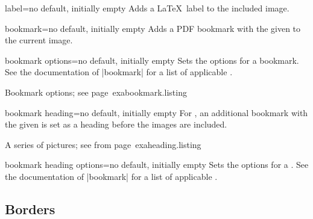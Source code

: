 \documentclass[a4paper,11pt]{ltxdoc}
\begin{document}
\clearpage

\begin{docIgrKey}{label}{=}{no default, initially empty}
  Adds a \LaTeX\ label to the included image.
\end{docIgrKey}


\begin{docIgrKey}{bookmark}{=}{no default, initially empty}
  Adds a PDF bookmark with the given  to the current image.
\end{docIgrKey}

\begin{docIgrKey}{bookmark options}{=}{no default, initially empty}
  Sets the options for a bookmark.
  See the documentation of
  |bookmark| \cite{oberdiek:bookmark} for a list of applicable .
\begin{texexptitled}%
  {Bookmark options; see page~\pageref{exabookmark}}{exabookmark.listing}
\end{texexptitled}
\end{docIgrKey}

\begin{docIgrKey}{bookmark heading}{=}{no default, initially empty}
  For , an additional bookmark with the given 
  is set as a heading before the images are included.
\begin{texexptitled}%
  {A series of pictures; see from page~\pageref{exaheading.1}}{exaheading.listing}
\end{texexptitled}
\end{docIgrKey}

\begin{docIgrKey}{bookmark heading options}{=}{no default, initially empty}
  Sets the options for a .
  See the documentation of
  |bookmark| \cite{oberdiek:bookmark} for a list of applicable .
\end{docIgrKey}

\clearpage
\subsection{Borders}
\end{document}
